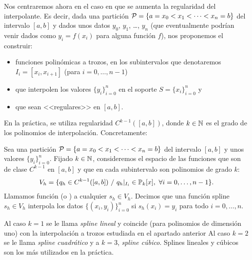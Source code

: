  Nos centraremos ahora en
 el caso en que se aumenta la regularidad del interpolante.
 Es decir, dada una partición 
 ${\cal P}= \{a = x_0 <x_1 < \cdots <x_n=b\}$
 del intervalo $[a,b]$ y dados unos datos $y_0$, $y_1$, \dots, $y_n$
 (que eventualmente podrían venir dados como $y_i=f(x_i)$ para alguna
 función $f$), nos proponemos el construir:
 \begin{itemize}
 \item  funciones polinómicas a trozos, en los subintervalos que
   denotaremos $I_i=[x_{i},x_{i+1}]$ (para $ i=0,\dots,n-1$)
 \item que interpolen los valores $\{y_i\}_{i=0}^n$ en el soporte
   $S=\{x_i\}_{i=0}^n$ y
 \item que sean <<regulares>> en $[a,b]$.
 \end{itemize}
 En la práctica, se utiliza regularidad $C^{k-1}([a,b])$, donde
 $k\in\operatorname{{\mathbb N}}$ es el grado de los polinomios de
 interpolación. Concretamente:%

 \begin{definition}
   \label{def:funcion-spline}
   Sea una partición ${\cal P}= \{a = x_0 <x_1 < \cdots <x_n=b\}$ del
   intervalo $[a,b]$ y unos valores $\{y_i\}_{i=0}^n$. Fijado
   $k\in\operatorname{{\mathbb N}}$, consideremos el espacio de las funciones que son
   de clase $C^{k-1}$ en $[a,b]$ y que en cada subintervalo son
   polinomios de grado $k$:
   \begin{equation*}
     V_h = \{q_h \in C^{k-1}([a,b])\ / \ q_h|_{I_i}\in  \Pol_k[x],\ \forall i=0,\dots,n-1\}.
   \end{equation*}
   Llamamos función  (o ) a
   cualquier $s_h\in V_h$. Decimos que una función spline $s_h\in V_h$
   interpola los datos $\{(x_i,y_i)\}_{i=0}^n$ si $s_h(x_i)=y_i$ para
   todo $i=0,\dots,n$.
 \end{definition}

 Al caso $k=1$ se le llama \textit{spline lineal} y coincide (para
 polinomios de dimensión uno) con la interpolación a trozos estudiada
 en el apartado anterior Al caso $k=2$ se le llama \textit{spline
   cuadrático} y a $k=3$, \textit{spline cúbico}. Splines lineales y
 cúbicos son los más utilizados en la práctica.

